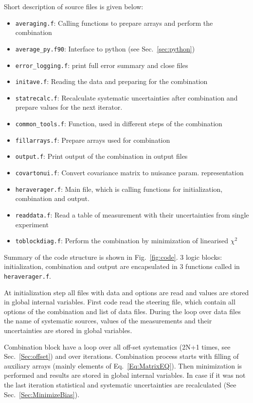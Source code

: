 Short description of source files is given below:

\begin{itemize}
\item {\tt averaging.f}: Calling functions to prepare arrays and perform the combination   
\item {\tt average\_py.f90}: Interface to python (see Sec.~\ref{sec:python})
\item {\tt error\_logging.f}: print full error summary and close files
\item {\tt initave.f}: Reading the data and preparing for the combination
\item {\tt statrecalc.f}: Recalculate systematic uncertainties after combination and prepare values for the next iterator. 
\item {\tt common\_tools.f}: Function, used in different steps of the combination 
\item {\tt fillarrays.f}: Prepare arrays used for combination
\item {\tt output.f}: Print output of the combination in output files
\item {\tt covartonui.f}: Convert covariance matrix to nuisance param. representation
\item {\tt heraverager.f}: Main file, which is calling functions for initialization, combination and output.
\item {\tt readdata.f}: Read a table of measurement with their uncertainties from single experiment
\item {\tt toblockdiag.f}: Perform the combination by minimization of linearised $\chi^2$
\end{itemize}

Summary of the code structure is shown in Fig.~\ref{fig:code}. 3 logic blocks: initialization, combination and output are encapsulated in 3 functions called in {\tt heraverager.f}.

At initialization step all files with data and options are read and values are stored in global internal variables. First code read the steering file, which contain all options of the combination and list of data files. During the loop over data files the name of systematic sources, values of the measurements and their uncertainties are stored in global variables.

Combination block have a loop over all off-set systematics (2N+1 times, see Sec.~\ref{Sec:offset}) and over iterations. Combination process starts with filling of auxiliary arrays (mainly elements of Eq.~\ref{Eq:MatrixEQ}). Then minimization is performed and results are stored in global internal variables. In case if it was not the last iteration statistical and systematic uncertainties are recalculated (See Sec.~\ref{Sec:MinimizeBias}).


